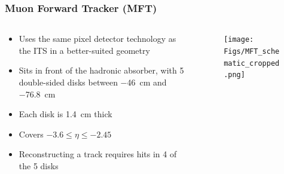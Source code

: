 \documentclass[10pt]{beamer}
\begin{document}
\begin{frame}
    \frametitle{Muon Forward Tracker (MFT)}

    \begin{columns}[c]
        \begin{column}{0.5\textwidth}
            \begin{itemize}
                \item Uses the same pixel detector technology as the ITS in a better-suited geometry
                \item Sits in front of the hadronic absorber, with 5 double-sided disks between \SI{-46}{\centi\metre} and \SI{-76.8}{\centi\metre}
                \item Each disk is \SI{1.4}{\centi\metre} thick
                \item Covers $-3.6\leq\eta\leq -2.45$
                \item Reconstructing a track requires hits in 4 of the 5 disks
            \end{itemize}
        \end{column}

        \begin{column}{0.5\textwidth}
            \begin{figure}[h]
                \begin{center}
                    \texttt{[image: Figs/MFT\_schematic\_cropped.png]}
                \end{center}
            \end{figure}
        \end{column}
    \end{columns}

\end{frame}
\end{document}
